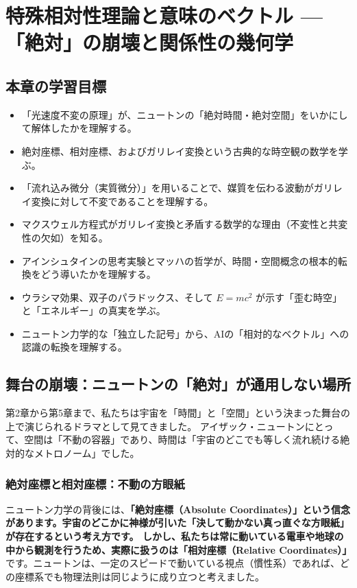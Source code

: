 \chapter{特殊相対性理論と意味のベクトル --- 「絶対」の崩壊と関係性の幾何学}

\section*{本章の学習目標}
\begin{itemize}
\item 「光速度不変の原理」が、ニュートンの「絶対時間・絶対空間」をいかにして解体したかを理解する。
\item 絶対座標、相対座標、およびガリレイ変換という古典的な時空観の数学を学ぶ。
\item 「流れ込み微分（実質微分）」を用いることで、媒質を伝わる波動がガリレイ変換に対して不変であることを理解する。
\item マクスウェル方程式がガリレイ変換と矛盾する数学的な理由（不変性と共変性の欠如）を知る。
\item アインシュタインの思考実験とマッハの哲学が、時間・空間概念の根本的転換をどう導いたかを理解する。
\item ウラシマ効果、双子のパラドックス、そして \ensuremath{E=mc^2} が示す「歪む時空」と「エネルギー」の真実を学ぶ。
\item ニュートン力学的な「独立した記号」から、AIの「相対的なベクトル」への認識の転換を理解する。
\end{itemize}

\section{舞台の崩壊：ニュートンの「絶対」が通用しない場所}

第2章から第5章まで、私たちは宇宙を「時間」と「空間」という決まった舞台の上で演じられるドラマとして見てきました。 アイザック・ニュートンにとって、空間は「不動の容器」であり、時間は「宇宙のどこでも等しく流れ続ける絶対的なメトロノーム」でした。

\subsection{絶対座標と相対座標：不動の方眼紙}

ニュートン力学の背後には、\textbf{「絶対座標（Absolute Coordinates）」という信念があります。宇宙のどこかに神様が引いた「決して動かない真っ直ぐな方眼紙」が存在するという考え方です。 しかし、私たちは常に動いている電車や地球の中から観測を行うため、実際に扱うのは「相対座標（Relative Coordinates）」}です。ニュートンは、一定のスピードで動いている視点（慣性系）であれば、どの座標系でも物理法則は同じように成り立つと考えました。

